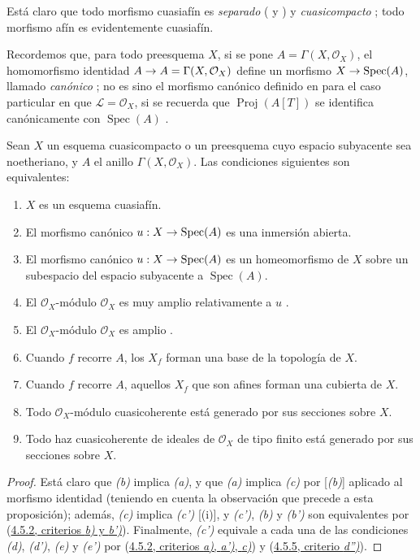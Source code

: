 \documentclass[oneside,10pt]{amsart}
\makeatletter
\newcommand{\ega@arrow}[2]{\mathchoice{#1}{#2}{#2}{#2}}
\renewcommand{\to}{\ega@arrow{\longrightarrow}{\rightarrow}}
\newcommand{\oldpage}[2][]{\marginnote{\normalfont\footnotesize\textbf{#1}~|~#2}\ignorespaces}
\let\EGAOriginalLabel\label
\renewcommand{\label}[1]{\phantomsection\EGAOriginalLabel{#1}}
\makeatother
\begin{document}
Está claro que todo morfismo cuasiafín es \emph{separado} ( y ) y \emph{cuasicompacto} ;
todo morfismo afín es evidentemente cuasiafín.

Recordemos que, para todo preesquema $X$, si se pone $A=\Gamma(X,\mathcal{O}_X)$, el homomorfismo identidad $A\to A=\Gamma(X,\mathcal{O}_X)$ define un morfismo $X\to\operatorname{Spec}(A)$, llamado \emph{canónico} ;
no es sino el morfismo canónico definido en  para el caso particular en que $\mathcal{L}=\mathcal{O}_X$, si se recuerda que $\operatorname{Proj}(A[T])$ se identifica canónicamente con $\operatorname{Spec}(A)$ .

\begin{proposition}[5.1.2]
\label{II.5.1.2-fr}
Sean $X$ un esquema cuasicompacto o un preesquema cuyo espacio subyacente sea noetheriano, y $A$ el anillo $\Gamma(X,\mathcal{O}_X)$.
Las condiciones siguientes son equivalentes:
\begin{enumerate}
  \item[{\rm(a)}] $X$ es un esquema cuasiafín.
  \item[{\rm(b)}] El morfismo canónico $u:X\to\operatorname{Spec}(A)$ es una inmersión abierta.
  \item[{\rm(b')}] El morfismo canónico $u:X\to\operatorname{Spec}(A)$ es un homeomorfismo de $X$ sobre un subespacio del espacio subyacente a $\operatorname{Spec}(A)$.
  \item[{\rm(c)}] El $\mathcal{O}_X$-módulo $\mathcal{O}_X$ es muy amplio relativamente a $u$ .
  \item[{\rm(c')}] El $\mathcal{O}_X$-módulo $\mathcal{O}_X$ es amplio .
  \item[{\rm(d)}] Cuando $f$ recorre $A$, los $X_f$ forman una base de la topología de $X$.
  \item[{\rm(d')}] Cuando $f$ recorre $A$, aquellos $X_f$ que son afines forman una cubierta de $X$.
\oldpage[II]{95}
  \item[{\rm(e)}] Todo $\mathcal{O}_X$-módulo cuasicoherente está generado por sus secciones sobre $X$.
  \item[{\rm(e')}] Todo haz cuasicoherente de ideales de $\mathcal{O}_X$ de tipo finito está generado por sus secciones sobre $X$.
\end{enumerate}
\end{proposition}

\begin{proof}
Está claro que \emph{(b)} implica \emph{(a)}, y que \emph{(a)} implica \emph{(c)} por [\emph{(b)}] aplicado al morfismo identidad (teniendo en cuenta la observación que precede a esta proposición);
además, \emph{(c)} implica \emph{(c')} [(i)], y \emph{(c')}, \emph{(b)} y \emph{(b')} son equivalentes por (\hyperref[II.4.5.2-fr]{4.5.2, criterios \emph{b)} y \emph{b')}}).
Finalmente, \emph{(c')} equivale a cada una de las condiciones \emph{(d)}, \emph{(d')}, \emph{(e)} y \emph{(e')} por (\hyperref[II.4.5.2-fr]{4.5.2, criterios \emph{a)}, \emph{a')}, \emph{c)}}) y (\hyperref[II.4.5.5-fr]{4.5.5, criterio \emph{d'')}}).
\end{proof}
\end{document}
